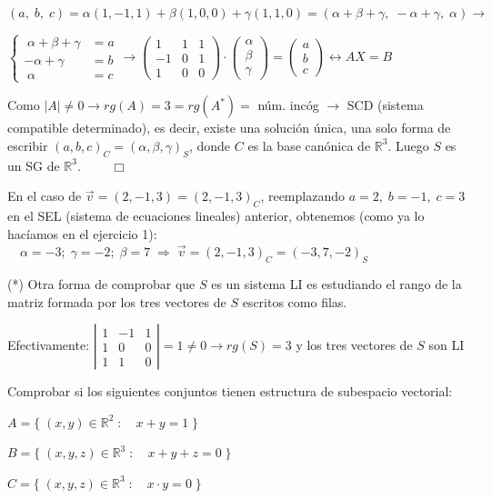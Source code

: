 \noindent $(a, \; b, \; c)=\alpha (1,-1,1)+  \beta (1,0,0)+ \gamma (1,1,0)=(\alpha+\beta+\gamma, \; -\alpha+\gamma,\; \alpha) \to$

\noindent $\begin{cases} \; \alpha+\beta+\gamma&=a\\ -\alpha+\gamma&=b\\ \; \alpha&=c \end{cases} \to \left( \begin{matrix} 1&1&1\\-1&0&1\\1&0&0 \end{matrix} \right)\cdot \left( \begin{matrix} \alpha \\ \beta \\ \gamma \end{matrix} \right)=\left( \begin{matrix} a \\ b \\c \end{matrix} \right) \leftrightarrow AX=B$

\noindent Como $|A|\neq 0 \to rg(A)=3=rg(A^*)=$ núm. incóg $\to$ SCD (sistema compatible determinado), es decir, existe una solución única, una solo forma de escribir $(a,b,c)_C=(\alpha,\beta,\gamma)_S$, donde $C$ es la base canónica de $\mathbb R^3$. Luego $S$ es un SG de  $\mathbb R^3$. $\qquad \Box$

\noindent En el caso de $\vec v=(2,-1,3)=(2,-1,3)_C$, reemplazando $a=2, \; b=-1, \; c=3$ en el SEL (sistema de ecuaciones lineales) anterior, obtenemos (como ya lo hacíamos en el ejercicio 1):  $\quad \alpha=-3; \; \gamma=-2; \; \beta=7 \; \Rightarrow  \; \vec v=(2,-1,3)_C=(-3,7,-2)_S$
	
	
\noindent \textcolor{gris}{(*) Otra forma de comprobar que $S$ es un sistema LI es estudiando el rango de la matriz formada por los tres vectores de $S$ escritos como filas.}

\noindent \textcolor{gris}{Efectivamente: $\left| \begin{matrix} 1&-1&1 \\ 1&0&0 \\ 1&1&0 \end{matrix} \right| =1 \neq 0 \to rg(S)=3$ y los tres vectores de $S$ son LI}


\begin{miejercicio}
	
	Comprobar si los siguientes conjuntos tienen estructura de subespacio vectorial:
	
	$A=\{\; (x,y)\in \mathbb R^2 \; :\quad x+y=1\;\} $
	
	$B=\{\; (x,y,z)\in \mathbb R^3 \; : \quad x+y+z=0\;\} $
	
	$C=\{\;(x,y,z)\in \mathbb R^3 \; : \quad x\cdot y=0 \;\} $
	
\end{miejercicio}

